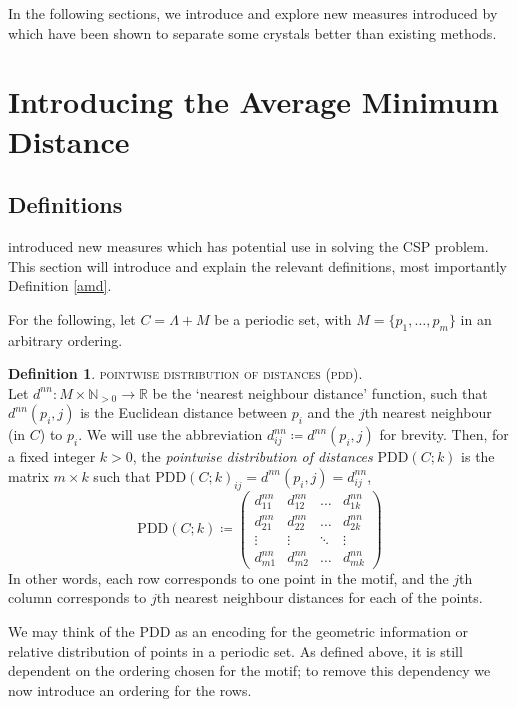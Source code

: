 \documentclass[11pt]{article}
\theoremstyle{definition}
\newtheorem{defi/}{Definition}[section]
\newenvironment{defi}
  {\renewcommand{\qedsymbol}{$\blacktriangleleft$}%
   \pushQED{\qed}\begin{defi/}}
  {\popQED\end{defi/}}
\begin{document}
In the following sections, we introduce and explore new measures introduced by \cite{2020-Mosca-Kurlin} which have been shown to separate some crystals better than existing methods.

\section{Introducing the Average Minimum Distance}

\subsection{Definitions}\label{defmk20}

\cite{2020-Mosca-Kurlin, mosca2020average} introduced new measures which has potential use in solving the CSP problem. This section will introduce and explain the relevant definitions, most importantly Definition \ref{amd}.

\null

For the following, let $C = \Lambda + M$ be a periodic set, with $M = \{p_1,\dots,p_m\}$ in an arbitrary ordering.

\begin{defi}\textsc{pointwise distribution of distances (pdd).}\\
Let $d^{nn}: M\times \mathbb{N}_{>0} \rightarrow \mathbb{R}$ be the `nearest neighbour distance' function, such that $d^{nn}(p_i, j)$ is the Euclidean distance between $p_i$ and the $j$th nearest neighbour (in $C$) to $p_i$. We will use the abbreviation $d^{nn}_{ij}\coloneqq d^{nn}(p_i,j)$ for brevity. Then, for a fixed integer $k>0$, the \emph{pointwise distribution of distances} PDD$(C;k)$ is the matrix $m\times k$ such that PDD$(C;k)_{ij} = d^{nn}(p_i,j) = d^{nn}_{ij}$,
\[
\text{PDD}(C;k) \coloneqq \begin{pmatrix}
d^{nn}_{11} & d^{nn}_{12} & \dots & d^{nn}_{1k} \\
d^{nn}_{21} & d^{nn}_{22} & \dots & d^{nn}_{2k} \\
\vdots        & \vdots        & \ddots & \vdots \\
d^{nn}_{m1} & d^{nn}_{m2} & \dots & d^{nn}_{mk}
\end{pmatrix}
\]
In other words, each row corresponds to one point in the motif, and the $j$th column corresponds to $j$th nearest neighbour distances for each of the points. \qedhere
\end{defi}

We may think of the PDD as an encoding for the geometric information or relative distribution of points in a periodic set. As defined above, it is still dependent on the ordering chosen for the motif; to remove this dependency we now introduce an ordering for the rows. 
\end{document}
